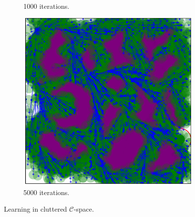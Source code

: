 \documentclass{ctuthesis}
\begin{document}
\begin{figure}[!ht]
\begin{subfigure}[b]{0.32\textwidth}
    \caption{1000 iterations.}
  \end{subfigure}  
  \begin{subfigure}[b]{0.32\textwidth}
    \includegraphics[width=\textwidth]{figChap5/Maze_clutter_RRTstarML_learning5000.pdf}  
    \caption{5000 iterations.}
  \end{subfigure}  
  \caption{Learning in cluttered $\mathcal{C}$-space.}
  \label{fig:learning_clutter}
\end{figure}
\end{document}

